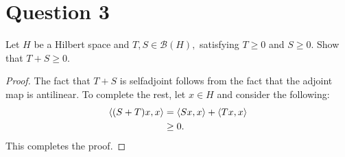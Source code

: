 \section{Question 3}
\horz

Let $H$ be a Hilbert space and $T, S\in \mathcal B(H),$ satisfying $T\geqslant 0$ and $S\geqslant 0.$ Show that $T+S \geqslant 0.$

\horz

\begin{proof}
    The fact that $T+S$ is selfadjoint follows from the fact that the adjoint map is antilinear. To complete the rest, let $x\in H$ and consider the following:
    \begin{align*}
	\left\langle (S+T)x,x \right\rangle &= \left\langle Sx,x \right\rangle + \left\langle Tx,x \right\rangle \\
	& \ge 0.
    \end{align*}
    This completes the proof.
\end{proof}
